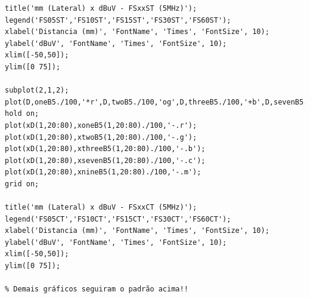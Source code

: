 \begin{lstlisting}
title('mm (Lateral) x dBuV - FSxxST (5MHz)');
legend('FS05ST','FS10ST','FS15ST','FS30ST','FS60ST');
xlabel('Distancia (mm)', 'FontName', 'Times', 'FontSize', 10);
ylabel('dBuV', 'FontName', 'Times', 'FontSize', 10);
xlim([-50,50]);
ylim([0 75]);

subplot(2,1,2);
plot(D,oneB5./100,'*r',D,twoB5./100,'og',D,threeB5./100,'+b',D,sevenB5./100,'xc',D,nineB5./100,'pm');
hold on;
plot(xD(1,20:80),xoneB5(1,20:80)./100,'-.r');
plot(xD(1,20:80),xtwoB5(1,20:80)./100,'-.g');
plot(xD(1,20:80),xthreeB5(1,20:80)./100,'-.b');
plot(xD(1,20:80),xsevenB5(1,20:80)./100,'-.c');
plot(xD(1,20:80),xnineB5(1,20:80)./100,'-.m');
grid on;

title('mm (Lateral) x dBuV - FSxxCT (5MHz)');
legend('FS05CT','FS10CT','FS15CT','FS30CT','FS60CT');
xlabel('Distancia (mm)', 'FontName', 'Times', 'FontSize', 10);
ylabel('dBuV', 'FontName', 'Times', 'FontSize', 10);
xlim([-50,50]);
ylim([0 75]);

% Demais gráficos seguiram o padrão acima!!

\end{lstlisting}

